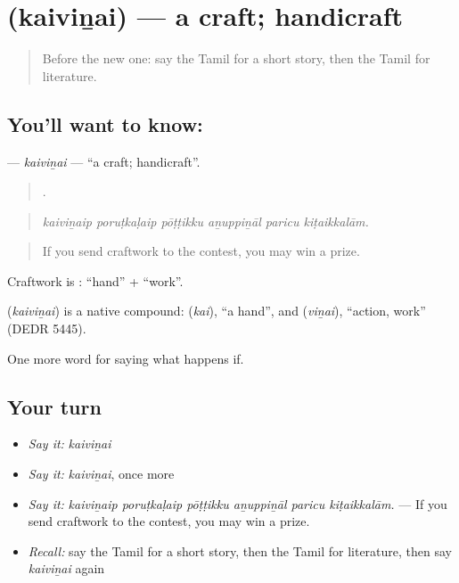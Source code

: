 \section[\texorpdfstring{\ta{கைவினை} (kaiviṉai)}{கைவினை (kaiviṉai)}]{ (kaiviṉai) — a craft; handicraft}

\label{lesson:TA-C556-kaivinai}



\begin{quote}
Before the new one: say the Tamil for a short story, then the Tamil for literature.
\end{quote}

\subsection*{You'll want to know: }
\textbf{} — \emph{kaiviṉai} — \textquotedblleft{}a craft; handicraft\textquotedblright{}.

\begin{quote}
     .
\end{quote}

\begin{quote}
\emph{kaiviṉaip poruṭkaḷaip pōṭṭikku aṉuppiṉāl paricu kiṭaikkalām.}
\end{quote}

\begin{quote}
If you send craftwork to the contest, you may win a prize.
\end{quote}

Craftwork is  :  \textquotedblleft{}hand\textquotedblright{} +  \textquotedblleft{}work\textquotedblright{}.

\begin{cousinweb}
\textbf{} (\emph{kaiviṉai}) is a native compound:  (\emph{kai}), \textquotedblleft{}a hand\textquotedblright{}, and  (\emph{viṉai}), \textquotedblleft{}action, work\textquotedblright{} (DEDR 5445).
\end{cousinweb}

\begin{grammarlens}[title={What you've built}]
One more word for saying what happens if.
\end{grammarlens}

\subsection*{Your turn}
\begin{itemize}
\raggedright
  \item \emph{Say it:} \emph{kaiviṉai}
  \item \emph{Say it:} \emph{kaiviṉai}, once more
  \item \emph{Say it:} \emph{kaiviṉaip poruṭkaḷaip pōṭṭikku aṉuppiṉāl paricu kiṭaikkalām.} — If you send craftwork to the contest, you may win a prize.
  \item \emph{Recall:} say the Tamil for a short story, then the Tamil for literature, then say \emph{kaiviṉai} again
\end{itemize}


